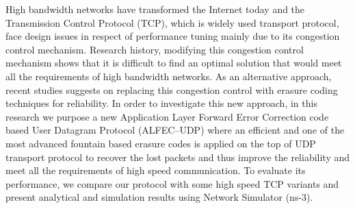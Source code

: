 \indent

High bandwidth networks have transformed the Internet today and the Transmission Control Protocol (TCP), which is widely used transport protocol, face design issues in respect of performance tuning mainly due to its congestion control mechanism. Research history, modifying this congestion control mechanism shows that it is difficult to find an optimal solution that would meet all the requirements of high bandwidth networks. As an alternative approach, recent studies suggests on replacing this congestion control with erasure coding techniques for reliability. In order to investigate this new approach, in this research we purpose a new Application Layer Forward Error Correction code based User Datagram Protocol (ALFEC--UDP) where an efficient and one of the most advanced fountain based erasure codes is applied on the top of UDP transport protocol to recover the lost packets and thus improve the reliability and meet all the requirements of high speed communication. To evaluate its performance, we compare our protocol with some high speed TCP variants and present analytical and simulation results using Network Simulator (ns-3). 

